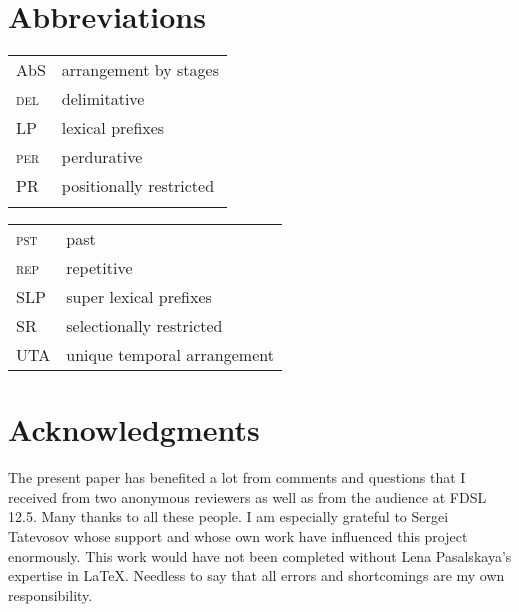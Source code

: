 \documentclass[output=paper,
]{langscibook}
\begin{document}
\section*{Abbreviations}
\begin{tabularx}{.45\textwidth}{lX}
AbS & arrangement by stages\\
\textsc{del}&delimitative\\
LP&lexical prefixes\\
\textsc{per}&perdurative\\
PR & positionally restricted\\
&\\
\end{tabularx}
\begin{tabularx}{.45\textwidth}{lX}
\textsc{pst}&past\\
\textsc{rep}&repetitive\\
SLP&super lexical prefixes\\
SR & selectionally restricted\\
UTA& unique temporal arrangement\\
\end{tabularx}

\section*{Acknowledgments}
The present paper has benefited a lot from comments and questions that I received from two anonymous reviewers as well as from the audience at FDSL 12.5. Many thanks to all these people. I am especially grateful to Sergei Tatevosov whose support and whose own work have influenced this project enormously. This work would have not been completed without Lena Pasalskaya's expertise in \LaTeX. Needless to say that all errors and shortcomings are my own responsibility.



\sloppy
\printbibliography[heading=subbibliography,notkeyword=this]
\end{document}
